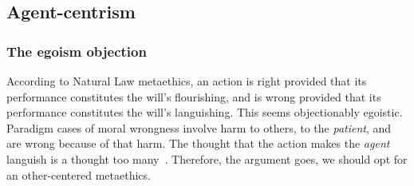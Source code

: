 



\subsection{Agent-centrism}
\subsubsection{The egoism objection}
According to Natural Law metaethics, an action is right provided that its performance constitutes the will's flourishing,
and is wrong provided that its performance constitutes the will's languishing. This seems objectionably egoistic. Paradigm
cases of moral wrongness involve harm to others, to the \textit{patient}, and are wrong because of that harm. The thought that the action makes the 
\textit{agent} languish is a thought too many~. Therefore, the argument goes, we should opt for an other-centered metaethics.

